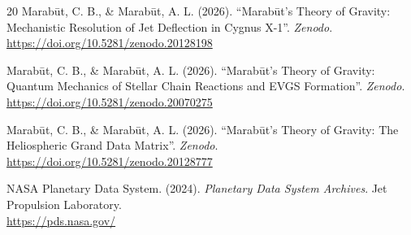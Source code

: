 \documentclass[11pt, a4paper]{article}
\begin{document}
\begin{thebibliography}{20}
  Marab\={u}t, C. B., \& Marab\={u}t, A. L. (2026). ``Marab\={u}t's Theory of Gravity: Mechanistic Resolution of Jet Deflection in Cygnus X-1''. \textit{Zenodo}. \\
  \url{https://doi.org/10.5281/zenodo.20128198}

  Marab\={u}t, C. B., \& Marab\={u}t, A. L. (2026). ``Marab\={u}t's Theory of Gravity: Quantum Mechanics of Stellar Chain Reactions and EVGS Formation''. \textit{Zenodo}. \\
  \url{https://doi.org/10.5281/zenodo.20070275}

  Marab\={u}t, C. B., \& Marab\={u}t, A. L. (2026). ``Marab\={u}t's Theory of Gravity: The Heliospheric Grand Data Matrix''. \textit{Zenodo}. \\
  \url{https://doi.org/10.5281/zenodo.20128777}

  NASA Planetary Data System. (2024). \textit{Planetary Data System Archives}. Jet Propulsion Laboratory. \\
  \url{https://pds.nasa.gov/}
  
\end{thebibliography}
\end{document}
